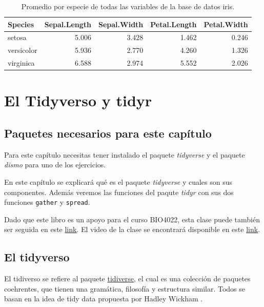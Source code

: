 \documentclass[]{book}
\begin{document}
\begin{table}

\caption{\label{tab:SummaryMeans}Promedio por especie de todas las variables de la base de datos iris.}
\centering
\begin{tabular}[t]{lrrrr}
\toprule
Species & Sepal.Length & Sepal.Width & Petal.Length & Petal.Width\\
\midrule
setosa & 5.006 & 3.428 & 1.462 & 0.246\\
versicolor & 5.936 & 2.770 & 4.260 & 1.326\\
virginica & 6.588 & 2.974 & 5.552 & 2.026\\
\bottomrule
\end{tabular}
\end{table}

\hypertarget{tidyverso}{%
\chapter{El Tidyverso y tidyr}\label{tidyverso}}

\hypertarget{paquetes-necesarios-para-este-capitulo-2}{%
\section{Paquetes necesarios para este
capítulo}\label{paquetes-necesarios-para-este-capitulo-2}}

Para este capítulo necesitas tener instalado el paquete \emph{tidyverse}
y el paquete \emph{dismo} para uno de los ejercicios.

En este capítulo se explicará qué es el paquete \emph{tidyverse}
\citep{Wickhamtidyverse} y cuales son sus componentes. Además veremos
las funciones del paqute \emph{tidyr} \citep{Wickhamtidy} con sus dos
funciones \texttt{gather} y \texttt{spread}.

Dado que este libro es un apoyo para el curso BIO4022, esta clase puede
también ser seguida en este
\href{https://derek-corcoran-barrios.github.io/Clase3/Clase3Hadleyverso}{link}.
El video de la clase se encontrará disponible en este
\href{https://www.youtube.com/watch?v=UhmHsx5X9Ug\&feature=youtu.be}{link}.

\hypertarget{el-tidyverso}{%
\section{El tidyverso}\label{el-tidyverso}}

El tidiverso se refiere al paquete
\href{https://www.tidyverse.org/}{tidiverse}, el cual es una colección
de paquetes coehrentes, que tienen una gramática, filosofía y estructura
similar. Todos se basan en la idea de tidy data propuesta por Hadley
Wickham \citep{wickham2014tidy}.
\end{document}
